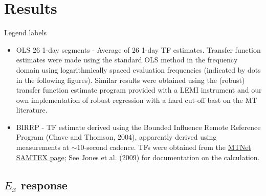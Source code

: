 \documentclass{article}
\begin{document}
\clearpage

\section{Results}

Legend labels

\begin{itemize}

    \item OLS 26 1-day segments - Average of 26 1-day TF estimates. Transfer function estimates were made using the standard OLS method in the frequency domain using logarithmically spaced evaluation frequencies (indicated by dots in the following figures). Similar results were obtained using the (robust) transfer function estimate program provided with a LEMI instrument and our own implementation of robust regression with a hard cut-off bast on the MT literature.

    \item BIRRP - TF estimate derived using the Bounded Influence Remote Reference Program (Chave and Thomson, 2004), apparently derived using measurements at $\sim$10-second cadence. TFs were obtained from the \href{https://www.mtnet.info/data/samtex/samtex.html}{MTNet SAMTEX page}; See Jones et al. (2009) for documentation on the calculation.

\end{itemize}

\clearpage

\subsection{$E_x$ response}
\end{document}
